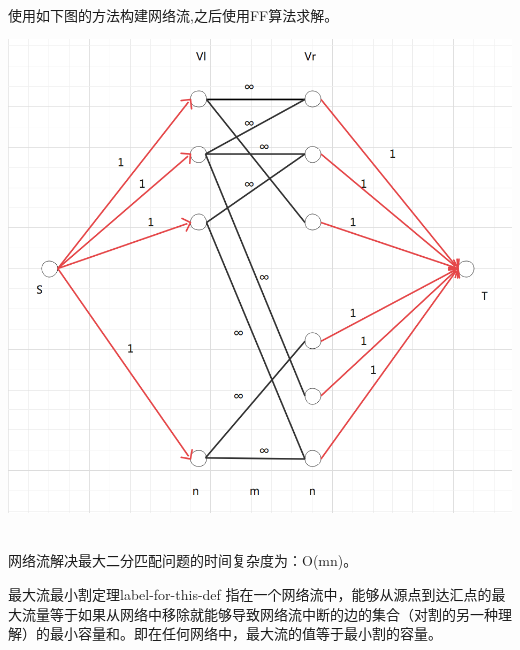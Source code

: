 \\使用如下图的方法构建网络流,之后使用FF算法求解。\\
\centerline{\includegraphics[scale=0.4]{Ln11.image/networkflow2.png}}
\\网络流解决最大二分匹配问题的时间复杂度为：O(mn)。

\begin{lemma}{最大流最小割定理}{label-for-this-def}
    指在一个网络流中，能够从源点到达汇点的最大流量等于如果从网络中移除就能够导致网络流中断的边的集合（对割的另一种理解）的最小容量和。即在任何网络中，最大流的值等于最小割的容量。
\end{lemma}

